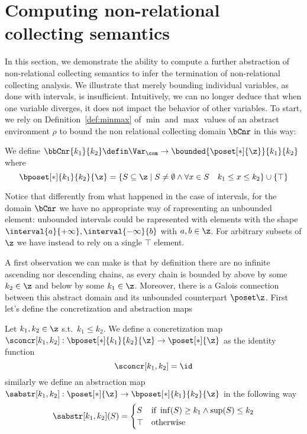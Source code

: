 \section{Computing non-relational collecting semantics}\label{sec:computingnonrel}

In this section, we demonstrate the ability to compute a further
abstraction of non-relational collecting semantics to infer the
termination of non-relational collecting analysis. We illustrate that
merely bounding individual variables, as done with intervals, is
insufficient. Intuitively, we can no longer deduce that when one
variable diverges, it does not impact the behavior of other variables.
To start, we rely on Definition~\ref{def:minmax} of \(\min\) and
\(\max\) values of an abstract environment \(\rho\) to bound the non
relational collecting domain \(\bCnr\) in this way:

\begin{definition}
  We define
  \(\bbCnr{k_1}{k_2} \defin \Var_{\com} \to \bounded{\poset[*]{\z}}{k_1}{k_2}\) where
  \begin{equation*}
    \bposet[*]{k_1}{k_2}{\z} = \{S \subseteq \z \mid S \neq \emptyset \land \forall x \in S \quad k_1 \leq x \leq k_2\} \cup \{\top\}
  \end{equation*}
\end{definition}
Notice that differently from what happened in the case of intervals,
for the domain \(\bCnr\) we have no appropriate way of rapresenting an
unbounded element: unbounded intervals could be rapresented with
elements with the shape
\(\interval{a}{+\infty}, \interval{-\infty}{b}\) with \(a,b\in
\z\). For arbitrary subsets of \(\z\) we have instead to rely on a
single \(\top\) element.

\medskip

\noindent
A first observation we can make is that by definition there are no
infinite ascending nor descending chains, as every chain is bounded by
above by some \(k_2 \in \z\) and below by some \(k_1\in\z\). Moreover,
there is a Galois connection between this abstract domain and its
unbounded counterpart \(\poset\z\). First let's define the
concretization and abstraction maps

\begin{definition}\label{def:abstrnrb}
  Let \(k_1,k_2\in\z\) s.t.\ \(k_1 \leq k_2\). We define a
  concretization map
  \(\sconcr[k_1,k_2] : \bposet[*]{k_1}{k_2}{\z} \to \poset[*]{\z}\) as
  the identity function
  \begin{equation*}
    \sconcr[k_1,k_2] = \id
  \end{equation*}
  similarly we define an abstraction map
  \(\sabstr[k_1,k_2] : \poset[*]{\z} \to \bposet[*]{k_1}{k_2}{\z}\) in
  the following way
  \begin{equation*}
    \sabstr[k_1,k_2](S) = \begin{cases}
      S & \text{if } \inf(S) \geq k_1 \land \sup(S) \leq k_2 \\
      \top & \text{otherwise}
    \end{cases}
  \end{equation*}
\end{definition}

